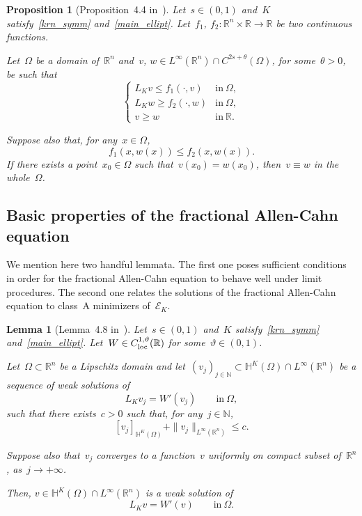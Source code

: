 \documentclass[10pt,a4paper]{amsart}
\newtheorem{prop}[theorem]{Proposition}
\newtheorem{lemma}[theorem]{Lemma}
\numberwithin{equation}{section}
\newcommand{\Rn}{\mathbb{R}^n}
\newcommand{\R}{\mathbb{R}}
\newcommand{\N}{\mathbb{N}}
\newcommand{\Ec}{\mathcal{E}_K}
\newcommand{\Hbb}{\mathbb{H}^K}
\renewcommand{\leqslant}{\leq}
\renewcommand{\geqslant}{\geq}
\begin{document}
   \begin{prop}[Proposition~4.4 in~\cite{CP16}]\label{comp}
     Let~$s\in (0,1)$ and~${K}$ satisfy~\eqref{krn_symm} and~\eqref{main_ellipt}. Let~$f_1$, $f_2: \R^n \times \R \to \R$ be two continuous functions. 
     
     Let~$\Omega$ be a domain of~$\R^n$ and~$v$, $w \in L^{\infty}(\R^n) \cap C^{2s+\theta}(\Omega)$, for some~$\theta>0$, be such that
   \begin{equation*}
   	\begin{cases}
   	L_K v \leqslant f_1(\cdot,v) & \mbox{in} \ \Omega,\\
   	L_K w \geqslant f_2(\cdot,w)  & \mbox{in} \ \Omega,\\
   	v \geqslant w & \mbox{in} \ \R.
   	\end{cases}
   \end{equation*}
   
   Suppose also that, for any~$x \in \Omega$,
   \begin{equation*}
   f_1(x,w(x)) \leqslant f_2(x,w(x)).
   \end{equation*}
  If there exists a point~$x_{0} \in \Omega$ such that~$v(x_{0}) =w(x_{0})$, then~$v \equiv w$ in the whole~$\Omega$.
   \end{prop}
  
    \subsection{Basic properties of the fractional Allen-Cahn equation}
We mention here two handful lemmata. The first one poses sufficient conditions in order for the fractional Allen-Cahn equation to behave well under limit procedures. The second one relates the solutions of the fractional Allen-Cahn equation to class~A minimizers of~$\Ec$.

 \begin{lemma}[Lemma~4.8 in~\cite{CP16}]\label{eq_stab}
      Let~$s\in (0,1)$ and~${K}$ satisfy~\eqref{krn_symm} and~\eqref{main_ellipt}. Let~$W \in C^{1,\vartheta}_{\rm loc}(\R)$ for some~$\vartheta \in (0,1)$. 
      
      Let~$\Omega \subset \Rn$ be a Lipschitz domain and let~$(v_j)_{j \in \N} \subset \Hbb(\Omega)\cap L^\infty(\Rn)$ be a sequence of weak solutions of
       $$
       L_K v_j = W'(v_j) \qquad \mbox{in} \ \Omega,
       $$
such that there exists~$c>0$ such that, for any~$j\in\mathbb{N}$,
       $$
       [v_j]_{\Hbb(\Omega)} + \|v_j\|_{L^\infty(\Rn)} \leqslant c.
       $$
       
       Suppose also that~$v_j$ converges to a function~$v$ uniformly on compact subset of~$\Rn$, as~$j\to+\infty$. 
       
       Then, $v \in \Hbb(\Omega)\cap L^\infty(\Rn)$ is a weak solution of
       $$
       L_K v = W'(v) \qquad \mbox{in} \ \Omega.
       $$
       \end{lemma}
    
\end{document}
